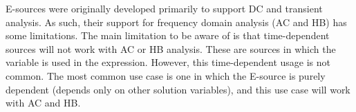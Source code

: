 E-sources were originally developed primarily to support DC and transient analysis.  
As such, their support for frequency domain analysis (AC and HB) has some limitations.  
The main limitation to be aware of is that time-dependent sources will not work with AC or HB analysis.  
These are sources in which the variable  is used in the  expression. 
However, this time-dependent usage is not common.  The most 
common use case is one in which the E-source is purely dependent (depends only 
on other solution variables), and this use case will work with AC and HB.  

